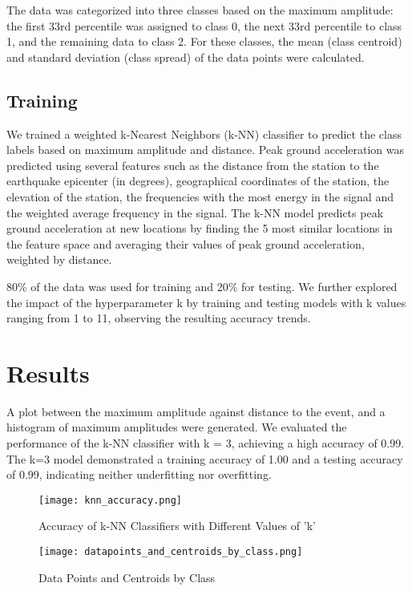 \documentclass[conference]{IEEEtran}
\begin{document}
The data was categorized into three classes based on the maximum amplitude: the
first 33rd percentile was assigned to class 0, the next 33rd percentile to class
1, and the remaining data to class 2. For these classes, the mean (class
centroid) and standard deviation (class spread) of the data points were
calculated.
\subsection{Training}
\label{sec:orgb1f79ea}
We trained a weighted k-Nearest Neighbors (k-NN) classifier to predict the class
labels based on maximum amplitude and distance. Peak ground acceleration was
predicted using several features such as the distance from the station to the
earthquake epicenter (in degrees), geographical coordinates of the station, the
elevation of the station, the frequencies with the most energy in the signal and
the weighted average frequency in the signal. The k-NN model predicts peak
ground acceleration at new locations by finding the 5 most similar locations in
the feature space and averaging their values of peak ground acceleration,
weighted by distance.

80\% of the data was used for training and 20\% for testing. We further explored
the impact of the hyperparameter k by training and testing models with k values
ranging from 1 to 11, observing the resulting accuracy trends.
\section{Results}
\label{sec:org6192cea}
A plot between the maximum amplitude against distance to the event, and a
histogram of maximum amplitudes were generated. We evaluated the
performance of the k-NN classifier with k = 3, achieving a high accuracy of
0.99. The k=3 model demonstrated a training accuracy of 1.00 and a testing
accuracy of 0.99, indicating neither underfitting nor overfitting.

\begin{figure}[htbp]
    \centering
    \texttt{[image: knn\_accuracy.png]}
    \caption{Accuracy of k-NN Classifiers with Different Values of 'k'}
    \label{fig:example}
\end{figure}


\begin{figure}[htbp]
    \centering
    \texttt{[image: datapoints\_and\_centroids\_by\_class.png]}
    \caption{Data Points and Centroids by Class}
    \label{fig:example}
\end{figure}
\end{document}
